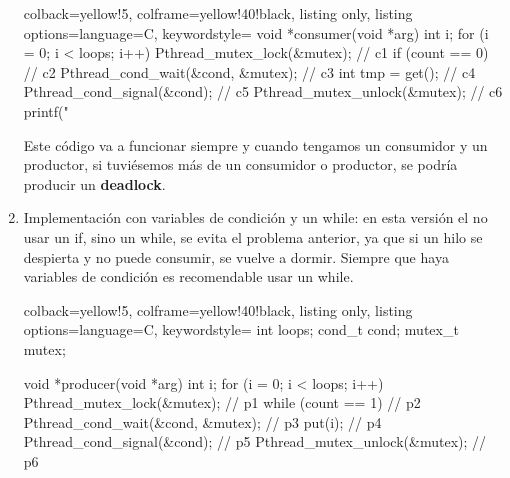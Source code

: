 \documentclass[openany]{book}
\begin{document}
\begin{enumerate}
\begin{tcblisting}{colback=yellow!5, colframe=yellow!40!black, listing only, listing options={language=C, keywordstyle=\color{blue!35!white}\bfseries}}
        void *consumer(void *arg) {
            int i;
            for (i = 0; i < loops; i++) {
                Pthread_mutex_lock(&mutex); // c1
                if (count == 0) // c2
                    Pthread_cond_wait(&cond, &mutex); // c3
                int tmp = get(); // c4
                Pthread_cond_signal(&cond); // c5
                Pthread_mutex_unlock(&mutex); // c6
                printf("%
            }
        }
        \end{tcblisting}
        Este código va a funcionar siempre y cuando tengamos un consumidor y un productor, si tuviésemos más de un consumidor o productor, se podría producir un \textbf{deadlock}.
        \newpage
        \item Implementación con variables de condición y un while: en esta versión el no usar un if, sino un while, se evita el problema anterior, ya que si un hilo se despierta y no puede consumir, se vuelve a dormir. Siempre que haya variables de condición es recomendable usar un while.
        \begin{tcblisting}{colback=yellow!5, colframe=yellow!40!black, listing only, listing options={language=C, keywordstyle=\color{blue!35!white}\bfseries}}
        int loops;
        cond_t cond;
        mutex_t mutex;
            
        void *producer(void *arg) {
            int i;
            for (i = 0; i < loops; i++) {
                Pthread_mutex_lock(&mutex); // p1
                while (count == 1) // p2
                    Pthread_cond_wait(&cond, &mutex); // p3
                put(i); // p4
                Pthread_cond_signal(&cond); // p5
                Pthread_mutex_unlock(&mutex); // p6
            }
        }
            

\end{tcblisting}
\end{enumerate}
\end{document}
